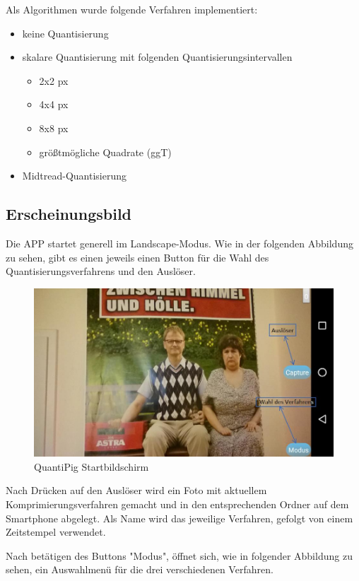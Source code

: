 Als Algorithmen wurde folgende Verfahren implementiert:

\begin{itemize}
	\item keine Quantisierung
	\item skalare Quantisierung mit folgenden Quantisierungsintervallen
		\begin{itemize}
			\item 2x2 px
			\item 4x4 px
			\item 8x8 px
			\item größtmögliche Quadrate (ggT)
		\end{itemize}
	\item Midtread-Quantisierung
\end{itemize}


\newpage
\subsection{Erscheinungsbild}
Die APP startet generell im Landscape-Modus. Wie in der folgenden Abbildung zu sehen, gibt es einen jeweils einen Button für die Wahl des Quantisierungsverfahrens und den Auslöser.

\begin{figure}[h]
	\centering
		\includegraphics[width=1.0\textwidth]{img/Startbildschirm_QuantiPig.jpg}
	\caption[QuantiPig Startbildschirm]{QuantiPig Startbildschirm}
	\label{fig:pig_menue}
\end{figure}

Nach Drücken auf den Auslöser wird ein Foto mit aktuellem Komprimierungsverfahren gemacht und in den entsprechenden Ordner auf dem Smartphone abgelegt. Als Name wird das jeweilige Verfahren, gefolgt von einem Zeitstempel verwendet.

Nach betätigen des Buttons "Modus", öffnet sich, wie in folgender Abbildung zu sehen, ein Auswahlmenü für die drei verschiedenen Verfahren.

